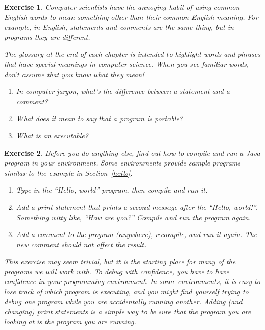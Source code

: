 \documentclass[12pt]{book}
\theoremstyle{exercise}
\newtheorem{exercise}{Exercise}[chapter]
\begin{document}
\begin{exercise}

Computer scientists have the annoying habit of using common
English words to mean something other than their common
English meaning.  For example, in English, statements and
comments are the same thing, but in programs they are different.

The glossary at the end of each chapter is intended to highlight
words and phrases that have special meanings in computer science.
When you see familiar words, don't assume that you know what
they mean!

\begin{enumerate}

\item In computer jargon, what's the difference between a statement
and a comment?

\item What does it mean to say that a program is portable?

\item What is an executable?

\end{enumerate}

\end{exercise}

\begin{exercise}

Before you do anything else, find out how to compile and run a Java
program in your environment.  Some environments provide sample programs
similar to the example in Section~\ref{hello}.

\begin{enumerate}

\item Type in the ``Hello, world'' program, then compile and run it.

\item Add a print statement that prints a second message after
the ``Hello, world!''.  Something witty like, ``How are you?''
Compile and run the program again.

\item Add a comment to the program (anywhere), recompile, and run
it again.  The new comment should not affect the result.

\end{enumerate}

This exercise may seem trivial, but it is the starting place for many
of the programs we will work with.  To debug with confidence,
you have to have confidence in your programming environment.  In some
environments, it is easy to lose track of which program is executing,
and you might find yourself trying to debug one program while you are
accidentally running another.  Adding (and changing) print statements
is a simple way to be sure that the program you are looking at is
the program you are running.

\end{exercise}
\end{document}

